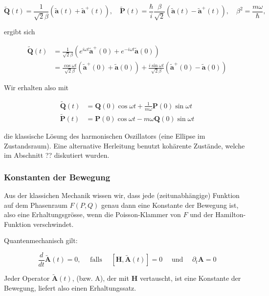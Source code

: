 \documentclass[10pt, letterpaper]{article}
\begin{document}
$$
\tilde{\mathbf{Q}}(t)=\frac{1}{\sqrt{2} \beta}\left(\tilde{\mathbf{a}}(t)+\tilde{\mathbf{a}}^{+}(t)\right), \quad \tilde{\mathbf{P}}(t)=\frac{\hbar}{i} \frac{\beta}{\sqrt{2}}\left(\tilde{\mathbf{a}}(t)-\tilde{\mathbf{a}}^{+}(t)\right), \quad \beta^{2}=\frac{m \omega}{\hbar},
$$

ergibt sich

$$
\begin{aligned}
\tilde{\mathbf{Q}}(t) & =\frac{1}{\sqrt{2} \beta}\left(e^{i \omega t} \tilde{\mathbf{a}}^{+}(0)+e^{-i \omega t} \tilde{\mathbf{a}}(0)\right) \\
& =\frac{\cos \omega t}{\sqrt{2} \beta}\left(\tilde{\mathbf{a}}^{+}(0)+\tilde{\mathbf{a}}(0)\right)+\frac{i \sin \omega t}{\sqrt{2} \beta}\left(\tilde{\mathbf{a}}^{+}(0)-\tilde{\mathbf{a}}(0)\right)
\end{aligned}
$$

Wir erhalten also mit

$$
\begin{aligned}
\tilde{\mathbf{Q}}(t) & =\mathbf{Q}(0) \cos \omega t+\frac{1}{m \omega} \mathbf{P}(0) \sin \omega t \\
\tilde{\mathbf{P}}(t) & =\mathbf{P}(0) \cos \omega t-m \omega \mathbf{Q}(0) \sin \omega t
\end{aligned}
$$

die klassische Lösung des harmonischen Oszillators (eine Ellipse im Zustandsraum). Eine alternative Herleitung benutzt kohärente Zustände, welche im Abschnitt ?? diskutiert wurden.










\subsubsection*{Konstanten der Bewegung}
Aus der klassichen Mechanik wissen wir, dass jede (zeitunabhängige) Funktion auf dem Phasenraum $F(P, Q)$ genau dann eine Konstante der Bewegung ist, also eine Erhaltungsgrösse, wenn die Poisson-Klammer von $F$ und der Hamilton-Funktion verschwindet.

Quantenmechanisch gilt:

$$
\frac{d}{d t} \tilde{\mathbf{A}}(t)=0, \quad \text { falls } \quad[\mathbf{H}, \tilde{\mathbf{A}}(t)]=0 \quad \text { und } \quad \partial_{t} \mathbf{A}=0
$$

Jeder Operator $\tilde{\mathbf{A}}(t)$, (bzw. A), der mit $\mathbf{H}$ vertauscht, ist eine Konstante der Bewegung, liefert also einen Erhaltungssatz.
\end{document}

